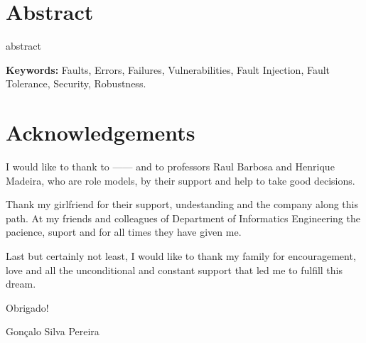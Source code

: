 \section*{Abstract}

abstract

\textbf{Keywords:} Faults, Errors, Failures, Vulnerabilities, Fault Injection, Fault Tolerance, Security, Robustness.

\newpage
\section*{Acknowledgements}

I would like to thank to ------ and to professors Raul Barbosa and Henrique Madeira, who are role models, by their support and help to take good decisions.

Thank my girlfriend for their support, undestanding and the company along this path. At my friends and colleagues of Department of Informatics Engineering the pacience, suport and for all times they have given me. 

Last but certainly not least, I would like to thank my family for encouragement, love and all the unconditional and constant support that led me to fulfill this dream. 

\hfill Obrigado!

\hfill Gonçalo Silva Pereira

\newpage